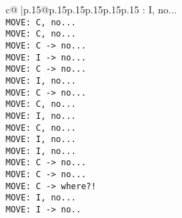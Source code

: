 \documentclass{article}
\begin{document}
{\begin{supertabular}{c@{$\;$}|p{.15\linewidth}@{}p{.15\linewidth}p{.15\linewidth}p{.15\linewidth}p{.15\linewidth}p{.15\linewidth}}
{{{: I, no...\\ \tt  MOVE: C, no...\\ \tt  MOVE: C, no...\\ \tt  MOVE: C -> no...\\ \tt  MOVE: I -> no...\\ \tt  MOVE: C -> no...\\ \tt  MOVE: I, no...\\ \tt  MOVE: C -> no...\\ \tt  MOVE: C, no...\\ \tt  MOVE: I, no...\\ \tt  MOVE: C, no...\\ \tt  MOVE: I, no...\\ \tt  MOVE: I, no...\\ \tt  MOVE: C -> no...\\ \tt  MOVE: C -> no...\\ \tt  MOVE: C -> where?!\\ \tt  MOVE: I, no...\\ \tt  MOVE: I -> no..}}}
\end{supertabular}}
\end{document}
